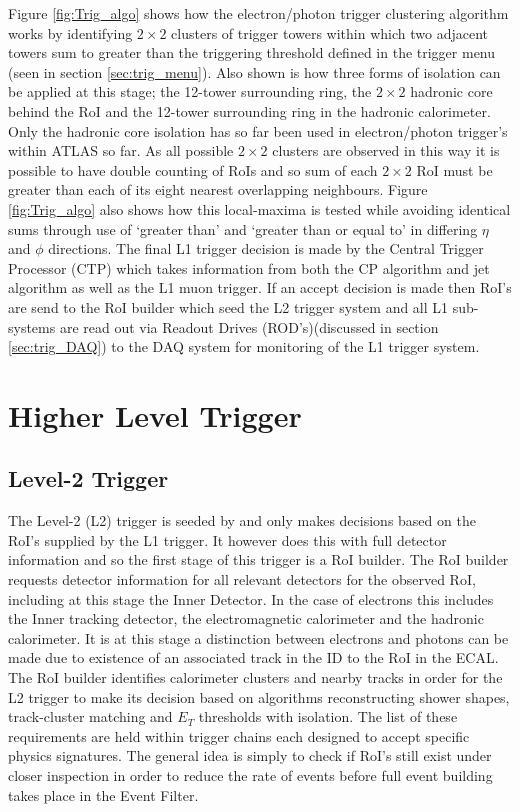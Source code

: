 	Figure \ref{fig:Trig_algo} shows how the electron/photon trigger clustering algorithm works by identifying $2 \times 2$ clusters of trigger towers within which two adjacent towers sum to greater than the triggering threshold defined in the trigger menu (seen in section \ref{sec:trig_menu}). Also shown is how three forms of isolation can be applied at this stage; the 12-tower surrounding ring, the $2 \times 2$ hadronic core behind the RoI and the 12-tower surrounding ring in the hadronic calorimeter. Only the hadronic core isolation has so far been used in electron/photon trigger's within ATLAS so far. 
	As all possible $2 \times 2$ clusters are observed in this way it is possible to have double counting of RoIs and so sum of each $2 \times 2$ RoI must be greater than each of its eight nearest overlapping neighbours. Figure \ref{fig:Trig_algo} also shows how this local-maxima is tested while avoiding identical sums through use of `greater than' and `greater than or equal to' in differing $\eta$ and $\phi$ directions. 
	The final L1 trigger decision is made by the Central Trigger Processor (CTP) which takes information from both the CP algorithm and jet algorithm as well as the L1 muon trigger. If an accept decision is made then RoI's are send to the RoI builder which seed the L2 trigger system and all L1 sub-systems are read out via Readout Drives (ROD's)(discussed in section \ref{sec:trig_DAQ}) to the DAQ system for monitoring of the L1 trigger system.



\section{Higher Level Trigger}

	\subsection*{Level-2 Trigger}

		The Level-2 (L2) trigger is seeded by and only makes decisions based on the RoI's supplied by the L1 trigger. It however does this with full detector information and so the first stage of this trigger is a RoI builder. The RoI builder requests detector information for all relevant detectors for the observed RoI, including at this stage the Inner Detector. In the case of electrons this includes the Inner tracking detector, the electromagnetic calorimeter and the hadronic calorimeter. It is at this stage a distinction between electrons and photons can be made due to existence of an associated track in the ID to the RoI in the ECAL. The RoI builder identifies calorimeter clusters and nearby tracks in order for the L2 trigger to make its decision based on algorithms reconstructing shower shapes, track-cluster matching and $E_{T}$ thresholds with isolation. The list of these requirements are held within trigger chains each designed to accept specific physics signatures. The general idea is simply to check if RoI's still exist under closer inspection in order to reduce the rate of events before full event building takes place in the Event Filter.


